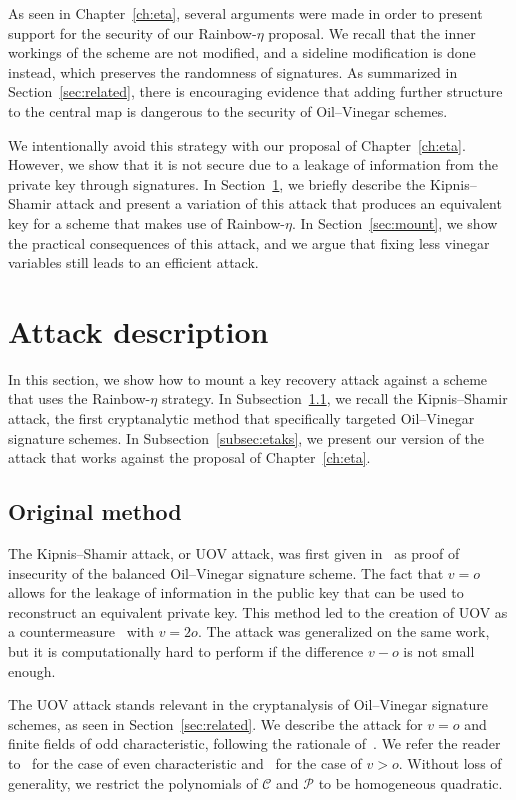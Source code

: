 \documentclass[12pt, a4paper, oneside]{memoir}
\theoremstyle{definition}
\begin{document}
As seen in Chapter~\ref{ch:eta}, several arguments were made in order to present support for the security of our Rainbow-$\eta$ proposal. We recall that the inner workings of the scheme are not modified, and a sideline modification is done instead, which preserves the randomness of signatures. As summarized in Section~\ref{sec:related}, there is encouraging evidence that adding further structure to the central map is dangerous to the security of Oil--Vinegar schemes.

We intentionally avoid this strategy with our proposal of Chapter~\ref{ch:eta}. However, we show that it is not secure due to a leakage of information from the private key through signatures. In Section~\ref{sec:atdesc}, we briefly describe the Kipnis--Shamir attack and present a variation of this attack that produces an equivalent key for a scheme that makes use of Rainbow-$\eta$. In Section~\ref{sec:mount}, we show the practical consequences of this attack, and we argue that fixing less vinegar variables still leads to an efficient attack.

\section{Attack description}\label{sec:atdesc}

In this section, we show how to mount a key recovery attack against a scheme that uses the Rainbow-$\eta$ strategy. In Subsection~\ref{subsec:ks}, we recall the Kipnis--Shamir attack, the first cryptanalytic method that specifically targeted Oil--Vinegar signature schemes. In Subsection~\ref{subsec:etaks}, we present our version of the attack that works against the proposal of Chapter~\ref{ch:eta}.

\subsection{Original method}\label{subsec:ks}

The Kipnis--Shamir attack, or UOV attack, was first given in~\cite{Kipnis:199808} as proof of insecurity of the balanced Oil--Vinegar signature scheme. The fact that $v = o$ allows for the leakage of information in the public key that can be used to reconstruct an equivalent private key. This method led to the creation of UOV as a countermeasure~\cite{Kipnis:199904} with $v = 2o$. The attack was generalized on the same work, but it is computationally hard to perform if the difference $v - o$ is not small enough.

The UOV attack stands relevant in the cryptanalysis of Oil--Vinegar signature schemes, as seen in Section~\ref{sec:related}. We describe the attack for $v = o$ and finite fields of odd characteristic, following the rationale of~\cite[Sec.~3.2]{Ding:2006}. We refer the reader to~\cite{Cao:201105} for the case of even characteristic and~\cite{Kipnis:199904} for the case of $v > o$. Without loss of generality, we restrict the polynomials of $\mathcal{C}$ and $\mathcal{P}$ to be homogeneous quadratic.
\end{document}
